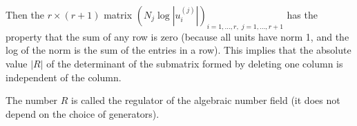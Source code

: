 Then the \( r \times (r+1) \) matrix \(\left(N_j\log \left|u_i^{(j)}\right|\right)_{i=1,\dots,r,\; j=1,\dots,r+1}\) has the property 
that the sum of any row is zero (because all units have norm 1, and the log of the norm is the sum of the entries in a row). 
This implies that the absolute value \( |R| \) of the determinant of the submatrix formed by deleting one column is independent of the column. 

The number \( R \) is called the regulator of the algebraic number field (it does not depend on the choice of generators). 


